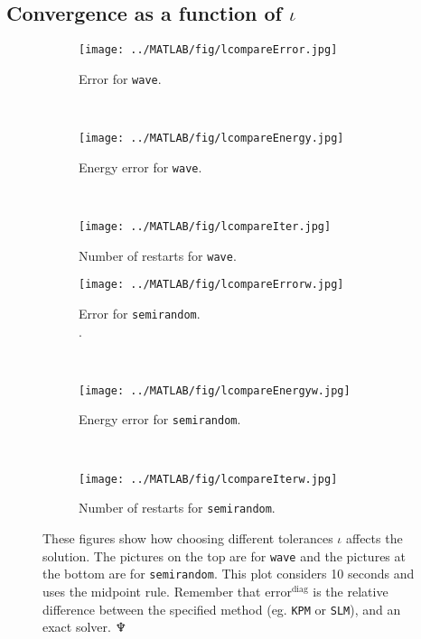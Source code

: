 \subsection{Convergence as a function of $\iota$}%
\begin{figure}[H]
        \centering
        \begin{subfigure}[b]{0.30\textwidth}
                \texttt{[image: ../MATLAB/fig/lcompareError.jpg]}
                \caption{ Error for \texttt{wave}. }
                \label{fig:lcompareError}
        \end{subfigure}
		~
        \begin{subfigure}[b]{0.30\textwidth}
                \texttt{[image: ../MATLAB/fig/lcompareEnergy.jpg]}
                \caption{ Energy error for \texttt{wave}. }
                \label{fig:lcompareEnergy}
        \end{subfigure}
        ~
		\begin{subfigure}[b]{0.30\textwidth}
                \texttt{[image: ../MATLAB/fig/lcompareIter.jpg]}
                \caption{ Number of restarts for \texttt{wave}. }
                \label{fig:lcompareIter}
        \end{subfigure}
        
		\begin{subfigure}[b]{0.30\textwidth}
                \texttt{[image: ../MATLAB/fig/lcompareErrorw.jpg]}
                \caption{ Error for \texttt{semirandom}. \\ .}
                \label{fig:lcompareErrorw}
        \end{subfigure}
		~
		\begin{subfigure}[b]{0.30\textwidth}
                \texttt{[image: ../MATLAB/fig/lcompareEnergyw.jpg]}
                \caption{ Energy error for \texttt{semirandom}. }
                \label{fig:lcompareEnergyw}
        \end{subfigure}
		~
		\begin{subfigure}[b]{0.30\textwidth}
                \texttt{[image: ../MATLAB/fig/lcompareIterw.jpg]}
                \caption{ Number of restarts for \texttt{semirandom}. }
                \label{fig:lcompareIterw}
        \end{subfigure}
        \caption{ These figures show how choosing different tolerances $\iota$ affects the solution. The pictures on the top are for \texttt{wave} and the pictures at the bottom are for \texttt{semirandom}. This plot considers 10 seconds and uses the midpoint rule. Remember that $\text{error}^{\text{diag}}$ is the relative difference between the specified method (eg. \texttt{KPM} or \texttt{SLM}), and an exact solver. \hfill $\neptune$  }
        \label{fig:lcompare}
\end{figure}
